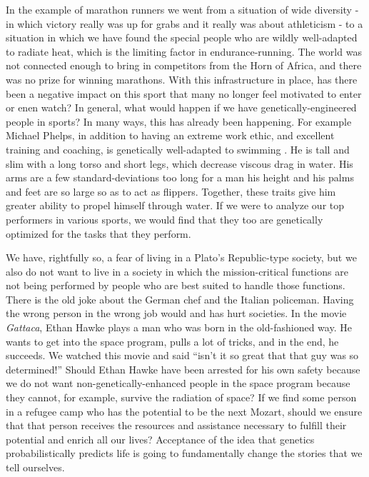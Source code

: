 In the example of marathon runners we went from a situation of wide diversity - in which victory really was up for grabs and it really was about athleticism - to a situation in which we have found the special people who are wildly well-adapted to radiate heat, which is the limiting factor in endurance-running.
The world was not connected enough to bring in competitors from the Horn of Africa, and there was no prize for winning marathons.
With this infrastructure in place, has there been a negative impact on this sport that many no longer feel motivated to enter or enen watch?
In general, what would happen if we have genetically-engineered people in sports?
In many ways, this has already been happening.
For example Michael Phelps, in addition to having an extreme work ethic, and excellent training and coaching, is genetically well-adapted to swimming \cite{Siebert2014}.
He is tall and slim with a long torso and short legs, which decrease viscous drag in water.
His arms are a few standard-deviations too long for a man his height and his palms and feet are so large so as to act as flippers.
Together, these traits give him greater ability to propel himself through water.
If we were to analyze our top performers in various sports, we would find that they too are genetically optimized for the tasks that they perform.

We have, rightfully so, a fear of living in a Plato's Republic-type society, but we also do not want to live in a society in which the mission-critical functions are not being performed by people who are best suited to handle those functions.
There is the old joke about the German chef and the Italian policeman.
Having the wrong person in the wrong job would and has hurt societies.
In the movie \textit{Gattaca}, Ethan Hawke plays a man who was born in the old-fashioned way.
He wants to get into the space program, pulls a lot of tricks, and in the end, he succeeds.
We watched this movie and said ``isn't it so great that that guy was so determined!''
Should Ethan Hawke have been arrested for his own safety because we do not want non-genetically-enhanced people in the space program because they cannot, for example, survive the radiation of space?
If we find some person in a refugee camp who has the potential to be the next Mozart, should we ensure that that person receives the resources and assistance necessary to fulfill their potential and enrich all our lives?
Acceptance of the idea that genetics probabilistically predicts life is going to fundamentally change the stories that we tell ourselves.

